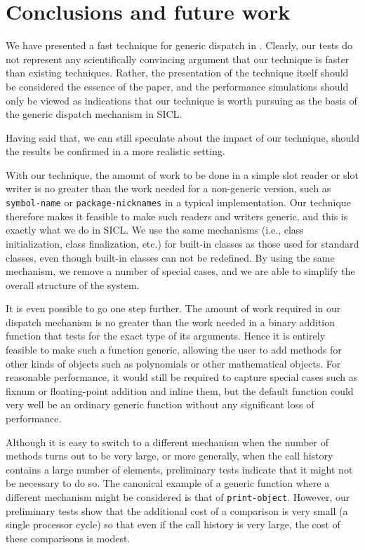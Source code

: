 \section{Conclusions and future work}

We have presented a fast technique for generic dispatch in \cl{}.
Clearly, our tests do not represent any scientifically convincing
argument that our technique is faster than existing
techniques. Rather, the presentation of the technique itself should be
considered the essence of the paper, and the performance simulations
should only be viewed as indications that our technique is worth
pursuing as the basis of the generic dispatch mechanism in SICL.

Having said that, we can still speculate about the impact of our
technique, should the results be confirmed in a more realistic setting. 

With our technique, the amount of work to be done in a simple slot reader
or slot writer is no greater than the work needed for a non-generic
version, such as \texttt{symbol-name} or \texttt{package-nicknames} in
a typical \cl{} implementation.  Our technique therefore makes it
feasible to make such readers and writers generic, and this is exactly
what we do in SICL.  We use the same \clos{} mechanisms (i.e., class
initialization, class finalization, etc.) for built-in classes as
those used for standard classes, even though built-in classes can not
be redefined.  By using the same mechanism, we remove a number of
special cases, and we are able to simplify the overall structure of the
system. 

It is even possible to go one step further.  The amount of work
required in our dispatch mechanism is no greater than the work needed
in a binary addition function that tests for the exact type of its
arguments.  Hence it is entirely feasible to make such a function
generic, allowing the user to add methods for other kinds of objects
such as polynomials or other mathematical objects.  For reasonable
performance, it would still be required to capture special cases such
as fixnum or floating-point addition and inline them, but the default
function could very well be an ordinary generic function without any
significant loss of performance. 

Although it is easy to switch to a different mechanism when the number
of methods turns out to be very large, or more generally, when the
call history contains a large number of elements, preliminary tests
indicate that it might not be necessary to do so.  The canonical
example of a generic function where a different mechanism might be
considered is that of \texttt{print-object}.  However, our preliminary
tests show that the additional cost of a comparison is very small (a
single processor cycle) so that even if the call history is very
large, the cost of these comparisons is modest. 

